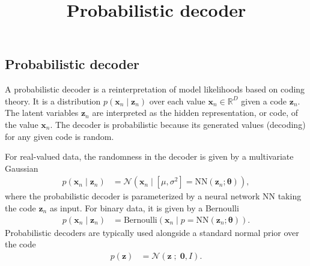 \title{Probabilistic decoder}

\subsection{Probabilistic decoder}

A probabilistic decoder is a reinterpretation of model likelihoods
based on coding theory. It is a distribution $p(\mathbf{x}_n\mid \mathbf{z}_n)$  over each value
$\mathbf{x}_n\in\mathbb{R}^D$ given a code $\mathbf{z}_n$. The latent
variables $\mathbf{z}_n$ are interpreted as the hidden representation, or code, of the value
$\mathbf{x}_n$. The decoder is probabilistic because its generated
values (decoding) for any given code is random.

For real-valued data,
the randomness in the decoder is given by a multivariate Gaussian
\begin{align*}
  p(\mathbf{x}_n\mid\mathbf{z}_n)
  &=
  \mathcal{N}(\mathbf{x}_n\mid [\mu,\sigma^2]=\mathrm{NN}(\mathbf{z}_n; \mathbf{\theta})),
\end{align*}
where the probabilistic decoder is parameterized by a neural network
$\mathrm{NN}$ taking the code $\mathbf{z}_n$ as input.
For binary data, it is given by a Bernoulli
\begin{align*}
  p(\mathbf{x}_n\mid\mathbf{z}_n)
  &=
  \text{Bernoulli}(\mathbf{x}_n\mid p=\mathrm{NN}(\mathbf{z}_n; \mathbf{\theta})).
\end{align*}
Probabilistic decoders are typically used alongside a standard normal
prior over the code
\begin{align*}
  p(\mathbf{z})
  &=
  \mathcal{N}(\mathbf{z} \;;\; \mathbf{0}, I).
\end{align*}

